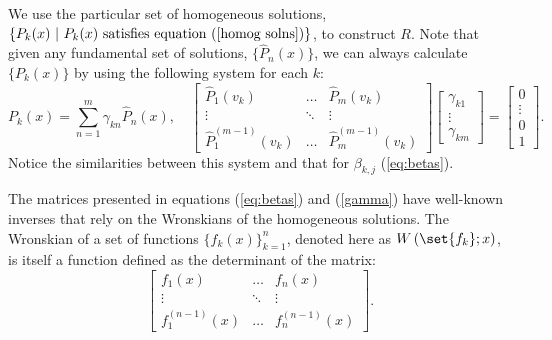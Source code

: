 \documentclass{book}
\begin{document}
We use the particular set of homogeneous solutions, $\{ P_k(x) \ | \ P_k(x) \ \text{satisfies equation} \ (\ref{homog solns}) \}$, to construct $R$.
Note that given any fundamental set of solutions, $\{ \hat{P}_n(x) \}$, we can always calculate $\{ P_k(x) \}$ by using the following system for each $k$:
\begin{equation} \label{gamma}
P_k(x) = \sum_{n=1}^m \gamma_{kn} \hat{P}_n(x), \quad 
\begin{bmatrix} \hat{P}_1(v_k) & \dots & \hat{P}_m(v_k)
\\ \vdots & \ddots & \vdots
\\ \hat{P}_1^{(m-1)}(v_k) & \dots & \hat{P}_m^{(m-1)}(v_k) \end{bmatrix}
\begin{bmatrix} \gamma_{k1} \\ \vdots \\ \gamma_{km} \end{bmatrix} =
\begin{bmatrix} 0 \\ \vdots \\ 0 \\ 1 \end{bmatrix} .
\end{equation}
Notice the similarities between this system and that for $\beta_{k,j}$ (\ref{eq:betas}).

The matrices presented in equations (\ref{eq:betas}) and (\ref{gamma}) have well-known inverses that rely on the Wronskians of the homogeneous solutions.
The Wronskian of a set of functions $\{ f_k(x) \}_{k=1}^n$, denoted here as $\W{\set{f_k}}{x}$, is itself a function defined as the determinant of the matrix:
\begin{equation}
\begin{bmatrix} f_1(x) & \dots & f_n(x) \\ \vdots & \ddots & \vdots \\ f^{(n-1)}_1(x) & \dots & f_n^{(n-1)}(x) \end{bmatrix} .
\end{equation}
\end{document}
